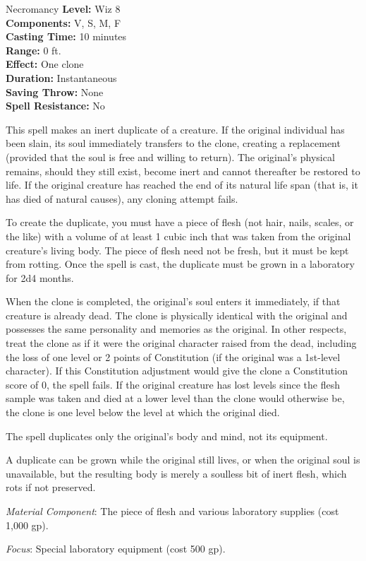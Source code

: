 {Necromancy}
{
	\textbf{Level:}
	Wiz 8\\
	\textbf{Components:}
	V, S, M, F\\
	\textbf{Casting Time:}
	10 minutes\\
	\textbf{Range:}
	0 ft.\\
	\textbf{Effect:}
	One clone\\
	\textbf{Duration:}
	Instantaneous\\
	\textbf{Saving Throw:}
	None\\
	\textbf{Spell Resistance:}
	No\\
}
{
	This spell makes an inert duplicate of a creature. If the original individual has been slain, its soul immediately transfers to the clone, creating a replacement (provided that the soul is free and willing to return). The original's physical remains, should they still exist, become inert and cannot thereafter be restored to life. If the original creature has reached the end of its natural life span (that is, it has died of natural causes), any cloning attempt fails.

	To create the duplicate, you must have a piece of flesh (not hair, nails, scales, or the like) with a volume of at least 1 cubic inch that was taken from the original creature's living body. The piece of flesh need not be fresh, but it must be kept from rotting. Once the spell is cast, the duplicate must be grown in a laboratory for 2d4 months.

	When the clone is completed, the original's soul enters it immediately, if that creature is already dead. The clone is physically identical with the original and possesses the same personality and memories as the original. In other respects, treat the clone as if it were the original character raised from the dead, including the loss of one level or 2 points of Constitution (if the original was a 1st-level character). If this Constitution adjustment would give the clone a Constitution score of 0, the spell fails. If the original creature has lost levels since the flesh sample was taken and died at a lower level than the clone would otherwise be, the clone is one level below the level at which the original died.

	The spell duplicates only the original's body and mind, not its equipment.

	A duplicate can be grown while the original still lives, or when the original soul is unavailable, but the resulting body is merely a soulless bit of inert flesh, which rots if not preserved.

	\textit{Material Component}:
	The piece of flesh and various laboratory supplies (cost 1,000 gp).

	\textit{Focus}:
	Special laboratory equipment (cost 500 gp).

}
